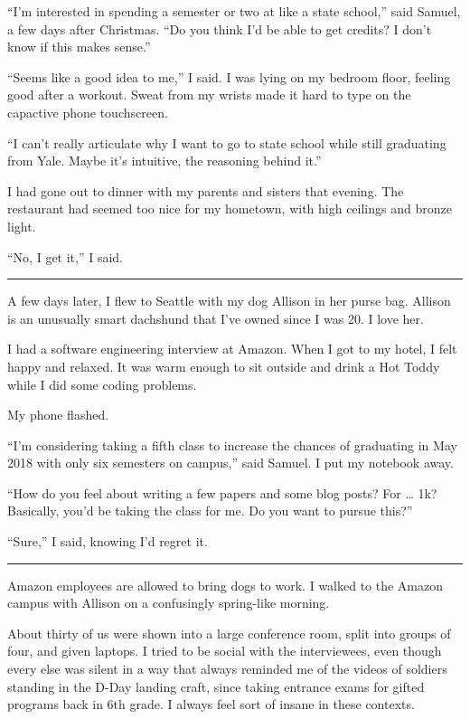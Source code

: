 ``I'm interested in spending a semester or two at like a state school,'' said
Samuel, a few days after Christmas.  ``Do you think I'd be able to get credits?
I don't know if this makes sense.''

``Seems like a good idea to me,'' I said.  I was lying on my bedroom floor,
feeling good after a workout.  Sweat from my wrists made it hard to type on 
the capactive phone touchscreen.

``I can't really articulate why I want to go to state school while still
graduating from Yale.   Maybe it's intuitive, the reasoning behind it.'' 

I had gone out to dinner with my parents and sisters that evening.  The
restaurant had seemed too nice for my hometown, with high ceilings and bronze
light.  

``No, I get it,'' I said.

\plainfancybreak{12pt}{2}{* * *}

A few days later, I flew to Seattle with my dog Allison in her purse bag.
Allison is an unusually smart dachshund that I've owned since I was 20.  I love
her.  

I had a software engineering interview at Amazon.  When I got to my hotel, I
felt happy and relaxed. It was warm enough to sit outside and drink a Hot Toddy
while I did some coding problems. 

My phone flashed.

``I'm considering taking a fifth class to increase the chances of graduating in
May 2018 with only six semesters on campus,'' said Samuel.  I put my notebook
away.

``How do you feel about writing a few papers and some blog posts?  For … 1k?
Basically, you'd be taking the class for me.  Do you want to pursue this?'' 

``Sure,'' I said, knowing I'd regret it.

\plainfancybreak{12pt}{2}{* * *}

Amazon employees are allowed to bring dogs to work.  I walked to the Amazon
campus with Allison on a confusingly spring-like morning. 

About thirty of us were shown into a large conference room, split into groups of
four, and given laptops.  I tried to be social with the interviewees, even
though every else was silent in a way that always reminded me of the videos of
soldiers standing in the D-Day landing craft, since taking entrance exams for
gifted programs back in 6th grade.  I always feel sort of insane in these
contexts.

